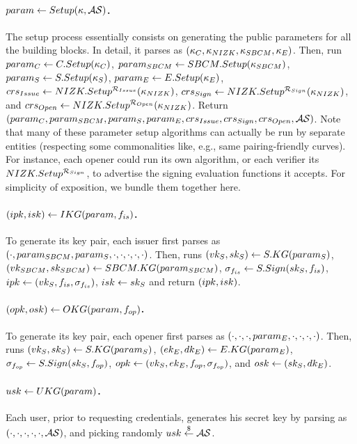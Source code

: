 \paragraph{$param \gets Setup(\kappa,\mathcal{AS})$.} %
The setup process essentially consists on generating the public parameters
for all the building blocks. In detail, it parses \secpar as $(\kappa_{C},
\kappa_{NIZK},\kappa_{SBCM},\kappa_{E})$. Then, run $param_C \gets
C.Setup(\kappa_{C})$, $param_{SBCM} \gets  SBCM.Setup(\kappa_{SBCM})$, $param_{S} \gets
S.Setup(\kappa_{S})$, $param_{E} \gets E.Setup(\kappa_{E})$, $crs_{Issue} \gets
NIZK.Setup^{\mathcal{R}_{Issue}}(\kappa_{NIZK})$, $crs_{Sign} \gets
NIZK.Setup^{\mathcal{R}_{Sign}}(\kappa_{NIZK})$, and $crs_{Open} \gets
NIZK.Setup^{\mathcal{R}_{Open}}(\kappa_{NIZK})$. Return $(param_C,param_{SBCM},
param_{S},param_{E},crs_{Issue},crs_{Sign},crs_{Open},
\mathcal{AS})$. Note that many of these parameter setup algorithms can
actually be run by separate entities (respecting some commonalities like,
e.g., same pairing-friendly curves). For instance, each opener could
run its own \ESetup algorithm, or each verifier its
$NIZK.Setup^{\mathcal{R}_{Sign}}$, to advertise the signing evaluation functions
it accepts. For simplicity of exposition, we bundle them together here.

\paragraph{$(ipk,isk) \gets IKG(param,f_{is})$.} %
To generate its key pair, each issuer first parses \parm as $(\cdot,param_{SBCM},
param_{S},\cdot,\cdot,\cdot,\cdot,\cdot)$. Then, runs $(vk_{S},sk_{S}) \gets
S.KG(param_{S})$, $(vk_{SBCM},sk_{SBCM}) \gets SBCM.KG(param_{SBCM})$,
$\sigma_{f_{is}} \gets S.Sign(sk_{S},f_{is})$, $ipk \gets (vk_{S},f_{is},
\sigma_{f_{is}})$, $isk \gets sk_{S}$ and return $(ipk,isk)$.

\paragraph{$(opk,osk) \gets OKG(param,f_{op})$.} %
To generate its key pair, each opener first parses \parm as $(\cdot,\cdot,
\cdot,param_{E},\cdot,\cdot,\cdot,\cdot)$. Then, runs $(vk_{S},sk_{S}) \gets S.KG
(param_{S})$, $(ek_{E},dk_{E}) \gets E.KG(param_{E})$, $\sigma_{f_{op}} \gets S.Sign
(sk_{S},f_{op})$, $opk \gets (vk_{S},ek_{E},f_{op},\sigma_{f_{op}})$, and $osk \gets
(sk_{S},dk_{E})$.

\paragraph{$usk \gets UKG(param)$.} %
Each user, prior to requesting credentials, generates his secret key by parsing
\parm as $(\cdot,\cdot,\cdot,\cdot,\cdot,\mathcal{AS})$, and picking randomly
$usk \stackrel{\$}{\gets} \mathcal{AS}$.

